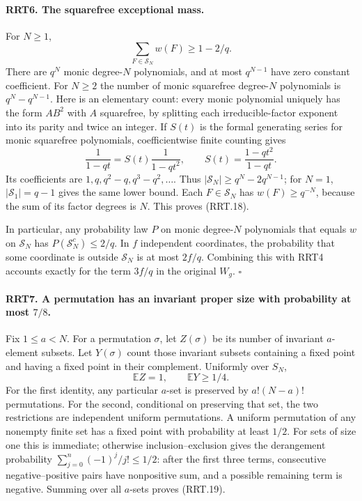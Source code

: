 \documentclass[11pt,a4paper]{article}
\numberwithin{equation}{section}
\theoremstyle{remark}\newtheorem{remark}[theorem]{Remark}
\begin{document}
\paragraph{RRT6. The squarefree exceptional mass.}
\label{claim:RRT6}
For $N\ge1$,
\[
                  \sum_{F\in\mathcal S_N}w(F)\ge1-2/q.
 \tag{RRT.18}
\]
There are $q^N$ monic degree-$N$ polynomials, and at most
$q^{N-1}$ have zero constant coefficient.  For $N\ge2$ the
number of monic squarefree degree-$N$ polynomials is
$q^N-q^{N-1}$.  Here is an elementary count: every monic
polynomial uniquely has the form $AB^2$ with $A$ squarefree,
by splitting each irreducible-factor exponent into its parity
and twice an integer.  If $S(t)$ is the formal generating series
for monic squarefree polynomials, coefficientwise finite
counting gives
\[
 \frac1{1-qt}=S(t)\frac1{1-qt^2},\qquad
                  S(t)=\frac{1-qt^2}{1-qt}.
\]
Its coefficients are $1,\allowbreak{} q,\allowbreak{} q^2-q,\allowbreak{} q^3-q^2,\ldots$.
Thus $|\mathcal S_N|\ge q^N-2q^{N-1}$; for $N=1$,
$|\mathcal S_1|=q-1$ gives the same lower bound.
Each $F\in\mathcal S_N$ has $w(F)\ge q^{-N}$, because the
sum of its factor degrees is $N$.  This proves (RRT.18).

In particular, any probability law $P$ on monic degree-$N$
polynomials that equals $w$ on $\mathcal S_N$ has
$P(\mathcal S_N^c)\le2/q$.  In $f$ independent coordinates,
the probability that some coordinate is outside $\mathcal S_N$
is at most $2f/q$.  Combining this with RRT4 accounts exactly
for the term $3f/q$ in the original $W_g$.
\hfill$\square$

\paragraph{RRT7. A permutation has an invariant proper size with probability at most $7/8$.}
\label{claim:RRT7}
Fix $1\le a<N$.  For a permutation $\sigma$, let $Z(\sigma)$
be its number of invariant $a$-element subsets.  Let
$Y(\sigma)$ count those invariant subsets containing a fixed
point and having a fixed point in their complement.  Uniformly
over $S_N$,
\[
                \mathbb EZ=1,\qquad \mathbb EY\ge1/4.
 \tag{RRT.19}
\]
For the first identity, any particular $a$-set is preserved by
$a!(N-a)!$ permutations.  For the second, conditional on
preserving that set, the two restrictions are independent uniform
permutations.  A uniform permutation of any nonempty finite set
has a fixed point with probability at least $1/2$.  For sets of
size one this is immediate; otherwise inclusion--exclusion gives
the derangement probability $\sum_{j=0}^n(-1)^j/j!\le1/2$:
after the first three terms, consecutive negative--positive
pairs have nonpositive sum, and a possible remaining term is
negative.  Summing over all $a$-sets proves (RRT.19).
\end{document}
